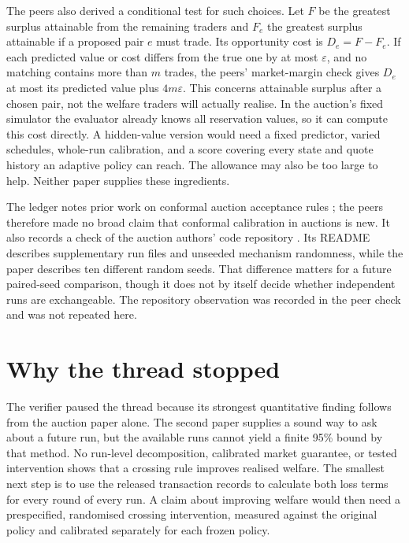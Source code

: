 \documentclass{article}
\begin{document}
The peers also derived a conditional test for such choices. Let \(F\) be the greatest surplus attainable from
the remaining traders and \(F_e\) the greatest surplus attainable if a proposed pair \(e\) must trade. Its
opportunity cost is \(D_e=F-F_e\). If each predicted value or cost differs from the true one by at most
\(\varepsilon\), and no matching contains more than \(m\) trades, the peers' market-margin check gives \(D_e\)
at most its predicted value plus \(4m\varepsilon\). This concerns attainable surplus after a chosen pair, not
the welfare traders will actually realise. In the auction's fixed simulator the evaluator already knows all
reservation values, so it can compute this cost directly. A hidden-value version would need a fixed predictor,
varied schedules, whole-run calibration, and a score covering every state and quote history an adaptive policy
can reach. The allowance may also be too large to help. Neither paper supplies these ingredients.

The ledger notes prior work on conformal auction acceptance rules \cite{lotan2024acceptance}; the peers
therefore made no broad claim that conformal calibration in auctions is new. It also records a check of the
auction authors' code repository \cite{marketrepository}. Its README describes supplementary run files and
unseeded mechanism randomness, while the paper describes ten different random seeds. That difference matters
for a future paired-seed comparison, though it does not by itself decide whether independent runs are
exchangeable. The repository observation was recorded in the peer check and was not repeated here.

\section{Why the thread stopped}

The verifier paused the thread because its strongest quantitative finding follows from the auction paper
alone. The second paper supplies a sound way to ask about a future run, but the available runs cannot yield a
finite 95\% bound by that method. No run-level decomposition, calibrated market guarantee, or tested
intervention shows that a crossing rule improves realised welfare. The smallest next step is to use the
released transaction records to calculate both loss terms for every round of every run. A claim about
improving welfare would then need a prespecified, randomised crossing intervention, measured against the
original policy and calibrated separately for each frozen policy.



\end{document}
